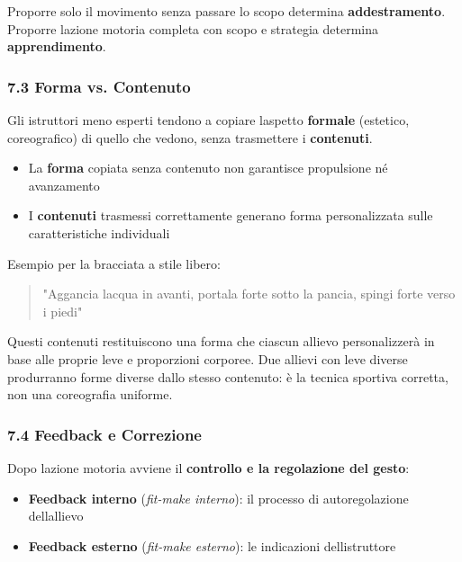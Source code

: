 \documentclass[a4paper,11pt]{article}
\providecommand{\tightlist}{%
  \setlength{\itemsep}{0pt}\setlength{\parskip}{0pt}}
\begin{document}
Proporre solo il movimento senza passare lo scopo determina
\textbf{addestramento}.\\
Proporre l\textquotesingle azione motoria completa con scopo e strategia
determina \textbf{apprendimento}.

\subsubsection{7.3 Forma vs. Contenuto}\label{forma-vs.-contenuto}

Gli istruttori meno esperti tendono a copiare l\textquotesingle aspetto
\textbf{formale} (estetico, coreografico) di quello che vedono, senza
trasmettere i \textbf{contenuti}.

\begin{itemize}
      \tightlist
      \item
            La \textbf{forma} copiata senza contenuto non garantisce propulsione
            né avanzamento
      \item
            I \textbf{contenuti} trasmessi correttamente generano forma
            personalizzata sulle caratteristiche individuali
\end{itemize}

Esempio per la bracciata a stile libero:

\begin{quote}
      "Aggancia l\textquotesingle acqua in avanti, portala forte sotto la
      pancia, spingi forte verso i piedi"
\end{quote}

Questi contenuti restituiscono una forma che ciascun allievo
personalizzerà in base alle proprie leve e proporzioni corporee. Due
allievi con leve diverse produrranno forme diverse dallo stesso
contenuto: è la tecnica sportiva corretta, non una coreografia uniforme.

\subsubsection{7.4 Feedback e Correzione}\label{feedback-e-correzione}

Dopo l\textquotesingle azione motoria avviene il \textbf{controllo e la
      regolazione del gesto}:

\begin{itemize}
      \tightlist
      \item
            \textbf{Feedback interno} (\emph{fit-make interno}): il processo di
            autoregolazione dell\textquotesingle allievo
      \item
            \textbf{Feedback esterno} (\emph{fit-make esterno}): le indicazioni
            dell\textquotesingle istruttore
\end{itemize}
\end{document}
